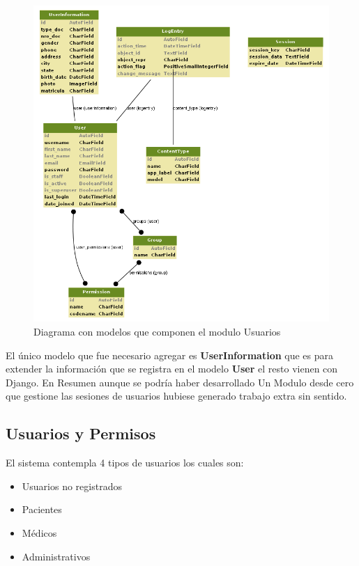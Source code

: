 \begin{figure}[H]
    \centering
    \includegraphics[scale=0.6]{resourse/auth.png}
    \caption{Diagrama con modelos que componen el modulo Usuarios}
    \label{fig:07}
\end{figure}

El único modelo que fue necesario agregar es \textbf{UserInformation} que es para extender la información que se registra en el modelo \textbf{User} el resto vienen con Django. En Resumen aunque se podría haber desarrollado Un Modulo desde cero que gestione las sesiones de usuarios hubiese generado trabajo extra sin sentido.

\subsection{Usuarios y Permisos}

El sistema contempla 4 tipos de usuarios los cuales son: 

\begin{itemize}
    \item Usuarios no registrados 
    \item Pacientes
    \item Médicos
    \item Administrativos
\end{itemize}

